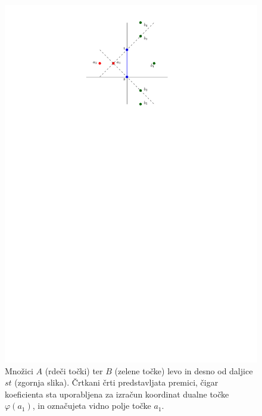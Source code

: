 \documentclass[a4paper, 12pt]{book}
\begin{document}
\begin{figure}
\centerline{\includegraphics[scale=1]{pics/dual_problem3.pdf}}
\caption{Množici $A$ (rdeči točki) ter $B$ (zelene točke) levo in desno od daljice $st$ (zgornja slika). Črtkani črti predstavljata premici, čigar koeficienta sta uporabljena za izračun koordinat dualne točke $\varphi (a_1)$, in označujeta vidno polje točke $a_1$.} 
\label{dualp}
\end{figure}
\end{document}

